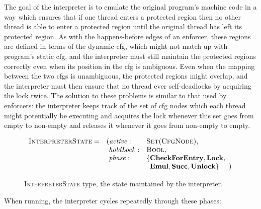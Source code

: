  The goal of the interpreter is to emulate the original
program's machine code in a way which ensures that if one thread
enters a protected region then no other thread is able to enter a
protected region until the original thread has left its protected
region.  As with the happens-before edges of an enforcer, these
regions are defined in terms of the dynamic \gls{cfg}, which might not
match up with program's static \gls{cfg}, and the interpreter must
still maintain the protected regions correctly even when its position
in the \gls{cfg} is ambiguous.  Even when the mapping between the two
\glspl{cfg} is unambiguous, the protected regions might overlap, and
the interpreter must then ensure that no thread ever self-deadlocks by
acquiring the lock twice.  The solution to these problems is similar
to that used by enforcers: the interpreter keeps track of the set of
\gls{cfg} nodes which each thread might potentially be executing and
acquires the lock whenever this set goes from empty to non-empty and
releases it whenever it goes from non-empty to empty.

\begin{figure}
  \begin{displaymath}
    \begin{array}{llll}
      \textsc{InterpreterState} = & (\mathit{active}: &\textsc{Set}(\textsc{CfgNode}), &\\
      & \,\,\mathit{holdLock}: &\textsc{Bool},\\
      & \,\,\mathit{phase}: & \{\mathbf{CheckForEntry}, \mathbf{Lock}, \\
      &                     & \,\,\,\mathbf{Emul}, \mathbf{Succ}, \mathbf{Unlock}\} &\!\!\!)\\
    \end{array}
  \end{displaymath}
  \caption{\textsc{InterpreterState} type, the state maintained by the
    interpreter.}
  \label{fig:fix_bugs:interpreter_state}
\end{figure}

When running, the interpreter cycles repeatedly through these phases:

